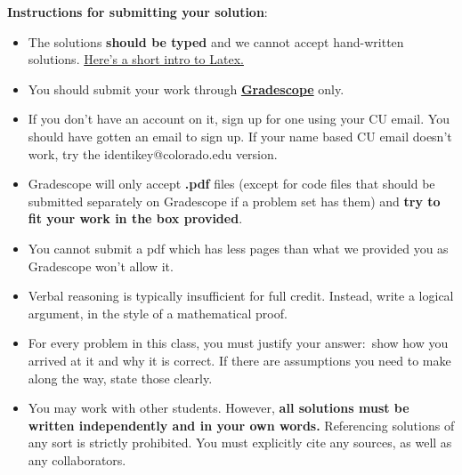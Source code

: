 \documentclass[12pt]{article}
\theoremstyle{remark}
\begin{document}
\renewcommand{\headrulewidth}{0.5pt}

\phantom{Test}

\begin{small}
\textbf{Instructions for submitting your solution}:
\vspace{-5mm} 

\begin{itemize}
	\item The solutions \textbf{should be typed} and we cannot accept hand-written solutions. \href{http://ece.uprm.edu/~caceros/latex/introduction.pdf}{Here's a short intro to Latex.}
	\item You should submit your work through \href{https://www.gradescope.com/courses/59294}{\textbf{Gradescope}} only.
	\item If you don't have an account on it, sign up for one using your CU email. You should have gotten an email to sign up. If your name based CU email doesn't work, try the identikey@colorado.edu version. 
	\item Gradescope will only accept \textbf{.pdf} files (except for code files that should be submitted separately on Gradescope if a problem set has them) and \textbf{try to fit your work in the box provided}. 
	\item You cannot submit a pdf which has less pages than what we provided you as Gradescope won't allow it. 
	\item Verbal reasoning is typically insufficient for full credit. Instead, write a logical argument, in the style of a mathematical proof.
	\item For every problem in this class, you must justify your answer:\ show how you arrived at it and why it is correct. If there are assumptions you need to make along the way, state those clearly.
	
	\item You may work with other students. However, \textbf{all solutions must be written independently and in your own words.} Referencing solutions of any sort is strictly prohibited. You must explicitly cite any sources, as well as any collaborators. 
\end{itemize}
\vspace{-4mm} 
\end{small}
\end{document}

